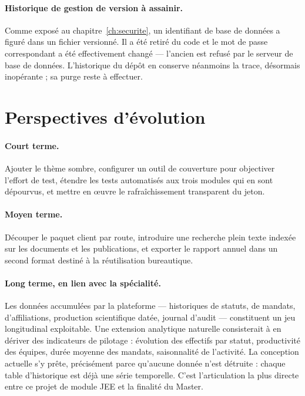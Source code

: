 \paragraph{Historique de gestion de version à assainir.} Comme exposé au
chapitre~\ref{ch:securite}, un identifiant de base de données a figuré dans un fichier
versionné. Il a été retiré du code et le mot de passe correspondant a été effectivement
changé --- l'ancien est refusé par le serveur de base de données. L'historique du dépôt en
conserve néanmoins la trace, désormais inopérante ; sa purge reste à effectuer.

\section{Perspectives d'évolution}

\paragraph{Court terme.} Ajouter le thème sombre, configurer un outil de couverture pour
objectiver l'effort de test, étendre les tests automatisés aux trois modules qui en sont
dépourvus, et mettre en œuvre le rafraîchissement transparent du jeton.

\paragraph{Moyen terme.} Découper le paquet client par route, introduire une recherche
plein texte indexée sur les documents et les publications, et exporter le rapport annuel
dans un second format destiné à la réutilisation bureautique.

\paragraph{Long terme, en lien avec la spécialité.} Les données accumulées par la plateforme
--- historiques de statuts, de mandats, d'affiliations, production scientifique datée,
journal d'audit --- constituent un jeu longitudinal exploitable. Une extension analytique
naturelle consisterait à en dériver des indicateurs de pilotage : évolution des effectifs
par statut, productivité des équipes, durée moyenne des mandats, saisonnalité de
l'activité. La conception actuelle s'y prête, précisément parce qu'aucune donnée n'est
détruite : chaque table d'historique est déjà une série temporelle. C'est l'articulation la
plus directe entre ce projet de module JEE et la finalité du Master.
